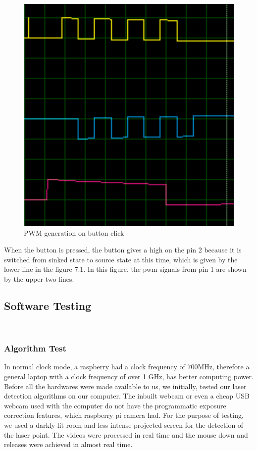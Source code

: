 \documentclass[12pt, a4paper]{article}
\begin{document}
\begin{figure}[htp]
\centering
\includegraphics[scale=0.30]{afterpress.png}
\caption{PWM generation on button click}
\label{}
\end{figure}

When the button is pressed, the button gives a high on the pin 2 because it is switched from sinked state to source state at this time, which is given by the lower line in the figure 7.1. In this figure, the pwm signals from pin 1 are shown by the upper two lines.

 

\subsection{Software Testing}
~\\
\subsubsection{Algorithm Test}
In normal clock mode, a raspberry had a clock frequency of 700MHz, therefore a general laptop with a clock frequency of over 1 GHz, has better computing power. Before all the hardwares were made available to us, we initially, tested our laser detection algorithms on our computer. The inbuilt webcam or even a cheap USB webcam used with the computer do not have the programmatic exposure correction features, which raspberry pi camera had. For the purpose of testing, we used a darkly lit room and less intense projected screen for the detection of the laser point. The videos were processed in real time and the mouse down and releases were achieved in almost real time. 
\end{document}

